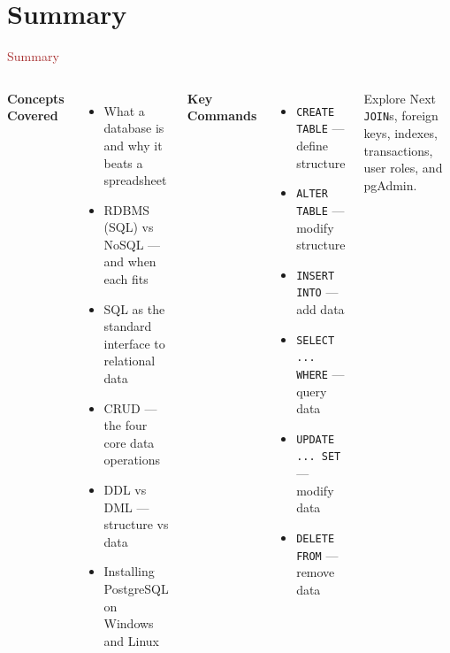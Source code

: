 \section{Summary}

\begin{frame}{\textcolor{brown}{Summary}}
  \begin{columns}[T]
      \textbf{Concepts Covered}
      \begin{itemize}
        \item What a database is and why it beats a spreadsheet
        \item RDBMS (SQL) vs NoSQL — and when each fits
        \item SQL as the standard interface to relational data
        \item CRUD — the four core data operations
        \item DDL vs DML — structure vs data
        \item Installing PostgreSQL on Windows and Linux
      \end{itemize}

      \textbf{Key Commands}
      \begin{itemize}
        \item \texttt{CREATE TABLE} — define structure
        \item \texttt{ALTER TABLE} — modify structure
        \item \texttt{INSERT INTO} — add data
        \item \texttt{SELECT ... WHERE} — query data
        \item \texttt{UPDATE ... SET} — modify data
        \item \texttt{DELETE FROM} — remove data
      \end{itemize}

      \begin{block}{Explore Next}
        \texttt{JOIN}s, foreign keys, indexes, transactions, user roles, and pgAdmin.
      \end{block}
  \end{columns}
\end{frame}
